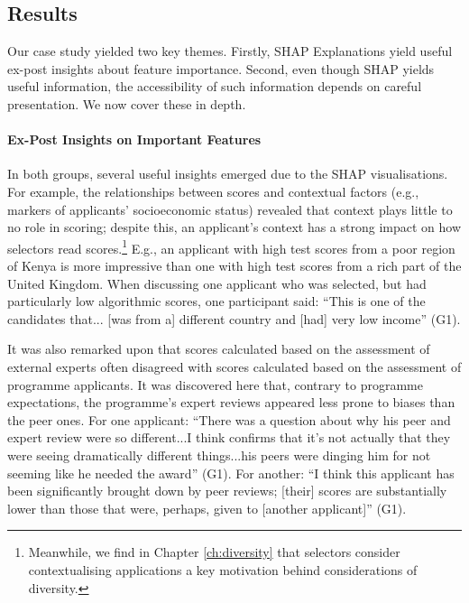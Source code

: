 

\subsection{Results}\label{sec:cs_results}
Our case study yielded two key themes. Firstly, SHAP Explanations yield useful ex-post insights about feature importance. Second, even though SHAP yields useful information, the accessibility of such information depends on careful presentation. We now cover these in depth.

\paragraph{Ex-Post Insights on Important Features}
In both groups, several useful insights emerged due to the SHAP visualisations. For example, the relationships between scores and contextual factors (e.g., markers of applicants' socioeconomic status) revealed that context plays little to no role in scoring; despite this, an applicant's context has a strong impact on how selectors read scores.\footnote{Meanwhile, we find in Chapter \ref{ch:diversity} that selectors consider contextualising applications a key motivation behind considerations of diversity.} E.g., an applicant with high test scores from a poor region of Kenya is more impressive than one with high test scores from a rich part of the United Kingdom. When discussing one applicant who was selected, but had particularly low algorithmic scores, one participant said: ``This is one of the candidates that... [was from a] different country and [had] very low income'' (G1).

It was also remarked upon that scores calculated based on the assessment of external experts often disagreed with scores calculated based on the assessment of programme applicants. It was discovered here that, contrary to programme expectations, the programme's expert reviews appeared less prone to biases than the peer ones. For one applicant: ``There was a question about why his peer and expert review were so different...I think confirms that it's not actually that they were seeing dramatically different things...his peers were dinging him for not seeming like he needed the award'' (G1). For another: ``I think this applicant has been significantly brought down by peer reviews; [their] scores are substantially lower than those that were, perhaps, given to [another applicant]'' (G1).


